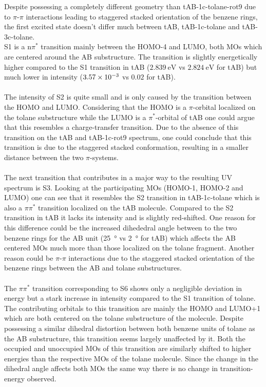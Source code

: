 %
Despite possessing a completely different geometry than tAB-1c-tolane-rot9 due to $\pi$-$\pi$ interactions leading to staggered stacked orientation of the benzene rings, the first excited state doesn't differ much between tAB, tAB-1c-tolane and tAB-3c-tolane. \\
S1 is a n$\pi^{*}$ transition mainly between the HOMO-4 and LUMO, both MOs which are centered around the AB substructure. The transition is slightly energetically higher compared to the S1 transition in tAB ($\SI{2.839}{\eV}$ vs $\SI{2.824}{\eV}$ for tAB) but much lower in intensity ($\SI{3.57E-3}{}$ vs $0.02$ for tAB). \\ 
\\
The intensity of S2 is quite small and is only caused by the transition between the HOMO and LUMO. Considering that the HOMO is a $\pi$-orbital localized on the tolane substructure while the LUMO is a $\pi^{*}$-orbital of tAB one could argue that this resembles a charge-transfer transition. Due to the absence of this transition on the tAB and tAB-1c-rot9 spectrum, one could conclude that this transition is due to the staggered stacked conformation, resulting in a smaller distance between the two $\pi$-systems. \\
\\
The next transition that contributes in a major way to the resulting UV spectrum is S3. Looking at the participating MOs (HOMO-1, HOMO-2 and LUMO) one can see that it resembles the S2 transition in tAB-1c-tolane which is also a $\pi\pi^{*}$ transition localized on the tAB molecule.
Compared to the S2 transition in tAB it lacks its intensity and is slightly red-shifted. One reason for this difference could be the increased dihededral angle between to the two benzene rings for the AB unit (\SI{25}{\degree} vs \SI{2}{\degree} for tAB) which affects the AB centered MOs much more than those localized on the tolane fragment. Another reason could be $\pi$-$\pi$ interactions due to the staggered stacked orientation of the benzene rings between the AB and tolane substructures.  \\
\\
The $\pi\pi^{*}$ transition corresponding to S6 shows only a negligible deviation in energy but a stark increase in intensity compared to the S1 transition of tolane. The contributing orbitals to this transition are mainly the HOMO and LUMO+1 which are both centered on the tolane substructure of the molecule. Despite possessing a similar dihedral distortion between both benzene units of tolane as the AB substructure, this transition seems largely unaffected by it. Both the occupied and unoccupied MOs of this transition are similarly shifted to higher energies than the respective MOs of the tolane molecule. Since the change in the dihedral angle affects both MOs the same way there is no change in transition-energy observed.
\\
%
%
%




